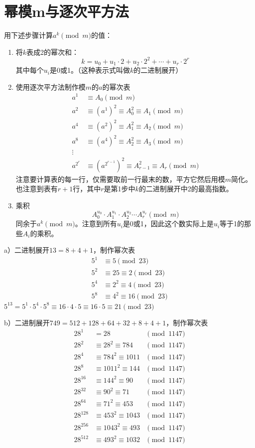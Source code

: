 \chapter{幂模m与逐次平方法}
\begin{algorithm}
用下述步骤计算$a^k\pmod m$的值：\par
\begin{enumerate}
\item 将$k$表成2的幂次和：
\[k=u_0+u_1\cdot2+u_2\cdot2^2+\cdots+u_r\cdot2^r\]
其中每个$u_i$是0或1。（这种表示式叫做$k$的二进制展开）
\item 使用逐次平方法制作模$m$的$a$的幂次表
\begin{align*}
a^1&\equiv A_0\pmod m\\
a^2&\equiv(a^1)^2\equiv A_0^2\equiv A_1\pmod m\\
a^4&\equiv(a^2)^2\equiv A_1^2\equiv A_2\pmod m\\
a^8&\equiv(a^4)^2\equiv A_2^2\equiv A_3\pmod m\\
\vdots\\
a^{2^r}&\equiv(a^{2^{r-1}})^2\equiv A_{r-1}^2\equiv A_r\pmod m
\end{align*}
注意要计算表的每一行，仅需要取前一行最末的数，平方它然后用模$m$简化。也注意到表有$r+1$行，其中$r$是第1步中$k$的二进制展开中2的最高指数。
\item 乘积
\[A_0^{u_0}\cdot A_1^{u_1}\cdot A_2^{u_2}\cdots A_r^{u_r}\pmod m\]
同余于$a^k\pmod m$。注意到所有$u_i$是0或1，因此这个数实际上是$u_i$等于1的那些$A_i$的乘积。
\end{enumerate}
\end{algorithm}
%
\exercise a）二进制展开$13=8+4+1$，制作幂次表
\begin{align*}
5^1&\equiv 5\pmod{23}\\
5^2&\equiv 25 \equiv 2\pmod{23}\\
5^4&\equiv2^2\equiv 4\pmod{23}\\
5^8&\equiv4^2\equiv 16\pmod{23}
\end{align*}
$5^{13}=5^1\cdot5^4\cdot5^8\equiv 16\cdot4\cdot5\equiv16\cdot5\equiv21\pmod{23}$\par
b）二进制展开$749=512+128+64+32+8+4+1$，制作幂次表
\begin{align*}
28^1&= 28&\pmod{1147}\\
28^2&\equiv 28^2\equiv784&\pmod{1147}\\
28^4&\equiv 784^2\equiv 1011&\pmod{1147}\\
28^8&\equiv 1011^2\equiv 144&\pmod{1147}\\
28^{16}&\equiv 144^2\equiv 90&\pmod{1147}\\
28^{32}&\equiv 90^2\equiv 71&\pmod{1147}\\
28^{64}&\equiv 71^2\equiv 453&\pmod{1147}\\
28^{128}&\equiv 453^2\equiv 1043&\pmod{1147}\\
28^{256}&\equiv 1043^2\equiv 493&\pmod{1147}\\
28^{512}&\equiv 493^2\equiv 1032&\pmod{1147}
\end{align*}
